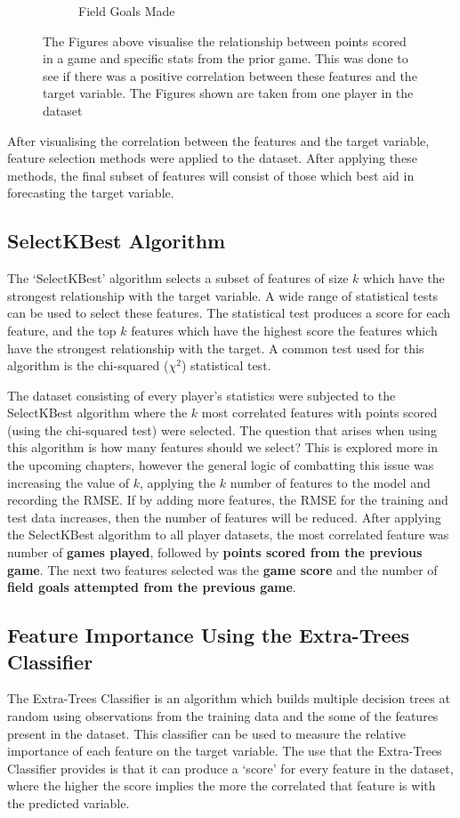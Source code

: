 \documentclass[a4paper,11pt,twoside]{article}
\begin{document}
\begin{figure} [h!]
\begin{subfigure}[b]{0.47\textwidth}
    \caption{Field Goals Made}
    \label{fig:3}
  \end{subfigure}
\caption{The Figures above visualise the relationship between points scored in a game and specific stats from the prior game. This was done to see if there was a positive correlation between these features and the target variable. The Figures shown are taken from one player in the dataset}
\end{figure}



After visualising the correlation between the features and the target variable, feature selection methods were applied to the dataset. After applying these methods, the final subset of features will consist of those which best aid in forecasting the target variable.

\subsection{SelectKBest Algorithm}
The `SelectKBest' algorithm selects a subset of features of size $k$ which have the strongest relationship with the target variable. A wide range of statistical tests can be used to select these features. The statistical test produces a score for each feature, and the top $k$ features which have the highest score the features which have the strongest relationship with the target. A common test used for this algorithm is the chi-squared ($\chi^{2}$) statistical test.  

The dataset consisting of every player's statistics were subjected to the SelectKBest algorithm where the $k$ most correlated features with points scored (using the chi-squared test) were selected. The question that arises when using this algorithm is how many features should we select? This is explored more in the upcoming chapters, however the general logic of combatting this issue was increasing the value of $k$, applying the $k$ number of features to the model and recording the RMSE. If by adding more features, the RMSE for the training and test data increases, then the number of features will be reduced. After applying the SelectKBest algorithm to all player datasets, the most correlated feature was number of \textbf{games played}, followed by \textbf{points scored from the previous game}. The next two features selected was the \textbf{game score} and the number of \textbf{field goals attempted from the previous game}.


 \subsection{Feature Importance Using the Extra-Trees Classifier}
 The Extra-Trees Classifier is an algorithm which builds multiple decision trees at random using observations from the training data and the some of the features present in the dataset. This classifier can be used to measure the relative importance of each feature on the target variable. The use that the Extra-Trees Classifier provides is that it can produce a `score' for every feature in the dataset, where the higher the score implies the more the correlated that feature is with the predicted variable.
 
\end{document}
